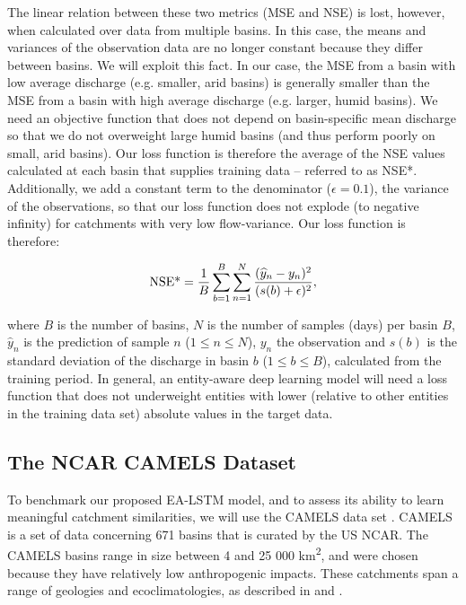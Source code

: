 The linear relation between these two metrics (\gls{MSE} and \gls{NSE}) is lost, however, when calculated over data from multiple basins. In this case, the means and variances of the observation data are no longer constant because they differ between basins. We will exploit this fact. In our case, the \gls{MSE} from a basin with low average discharge (e.g. smaller, arid basins) is generally smaller than the \gls{MSE} from a basin with high average discharge (e.g. larger, humid basins). We need an objective function that does not depend on basin-specific mean discharge so that we do not overweight large humid basins (and thus perform poorly on small, arid basins). Our loss function is therefore the average of the \gls{NSE} values calculated at each basin that supplies training data -- referred to as \gls{NSE*}. 
Additionally, we add a constant term to the denominator ($\epsilon = 0.1$), the variance of the observations, so that our loss function does not explode (to negative infinity) for catchments with very low flow-variance. Our loss function is therefore:

\begin{equation}
    \textup{NSE*} = \frac{1}{B} \sum_{b=1}^{B} \sum_{n=1}^{N} \frac{(\widehat{y}_n - y_n)^2}{(s(b) + \epsilon)^2},
\end{equation}

where $B$ is the number of basins, $N$ is the number of samples (days) per basin $B$, $\widehat{y}_n$ is the prediction of sample $n$ ($1 \leq n \leq N$), $y_n$ the observation and $s(b)$ is the standard deviation of the discharge in basin $b$ ($1 \leq b \leq B$), calculated from the training period. In general, an entity-aware deep learning model will need a loss function that does not underweight entities with lower (relative to other entities in the training data set) absolute values in the target data.

\subsection{The NCAR CAMELS Dataset}

To benchmark our proposed \gls{EA-LSTM} model, and to assess its ability to learn meaningful catchment similarities, we will use the \gls{CAMELS} data set \citep{newman2014large,addor2017large}. 
\gls{CAMELS} is a set of data concerning 671 basins that is curated by the US \gls{NCAR}. 
The \gls{CAMELS} basins range in size between 4 and 25 000 km\textsuperscript{2}, and were chosen because they have relatively low anthropogenic impacts. These catchments span a range of geologies and ecoclimatologies, as described in \citet{newman2015development} and \citet{addor2017camels}.

